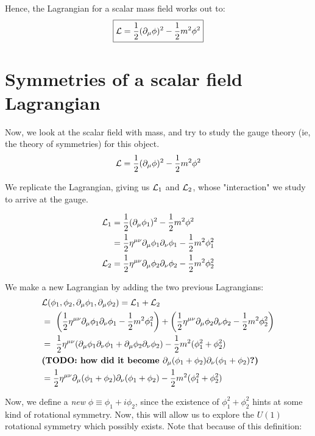 Hence, the Lagrangian for a scalar mass field works out to:
\begin{equation}
    \boxed{\mathcal{L} = \frac{1}{2} (\partial_\mu \phi)^2 - \frac{1}{2} m^2 \phi^2}
\end{equation}

\section{Symmetries of a scalar field Lagrangian}
Now, we look at the scalar field with mass, and try to study the gauge
theory (ie, the theory of symmetries) for this object.
$$
\mathcal{L} = \frac{1}{2} (\partial_\mu \phi)^2 - \frac{1}{2} m^2 \phi^2
$$

We replicate the Lagrangian, giving us $\mathcal{L}_1$ and $\mathcal{L}_2$, whose "interaction"
we study to arrive at the gauge.

\begin{align*}
\Lag_1 &= \frac{1}{2} (\partial_\mu \phi_1)^2 - \frac{1}{2} m^2 \phi^2 \\
&=\frac{1}{2} \eta^{\mu \nu} \partial_\mu \phi_1 \partial_\nu \phi_1 - \frac{1}{2} m^2 \phi_1^2 \\
%
\Lag_2 &= \frac{1}{2} \eta^{\mu \nu} \partial_\mu \phi_2 \partial_\nu \phi_2 - \frac{1}{2} m^2 \phi_2^2
\end{align*}

We make a new Lagrangian by adding the two previous Lagrangians:
\begin{align*}
&\Lag(\phi_1, \phi_2, \partial_\mu \phi_1, \partial_\mu \phi_2) = \Lag_1 + \Lag_2 \\
%
&=~\bigg(\frac{1}{2} \eta^{\mu \nu} \partial_\mu \phi_1 \partial_\nu \phi_1 - \frac{1}{2} m^2 \phi_1^2\bigg) +
\bigg(\frac{1}{2} \eta^{\mu \nu} \partial_\mu \phi_2 \partial_\nu \phi_2 - \frac{1}{2} m^2 \phi_2^2\bigg) \\
%
&=~\frac{1}{2} \eta^{\mu \nu}(\partial_\mu \phi_1 \partial_\nu \phi_1 + \partial_\mu \phi_2 \partial_\nu \phi_2)
- \frac{1}{2} m^2 (\phi_1^2 + \phi_2^2) \\
%
&\textbf{(TODO: how did it become $\partial_\mu (\phi_1 + \phi_2) \partial_\nu (\phi_1 + \phi_2)$?)} \\
%
&=\frac{1}{2} \eta^{\mu \nu} \partial_\mu (\phi_1 + \phi_2) \partial_\nu (\phi_1 + \phi_2)
- \frac{1}{2} m^2 (\phi_1^2 + \phi_2^2)
\end{align*}

Now, we define a \textit{new} $\phi \equiv \phi_1 + i \phi_2$, since the existence of
$\phi_1^2 + \phi_2^2$ hints at some kind of rotational symmetry. Now, this will allow
us to explore the $U(1)$ rotational symmetry which possibly exists. Note that because of this definition:

